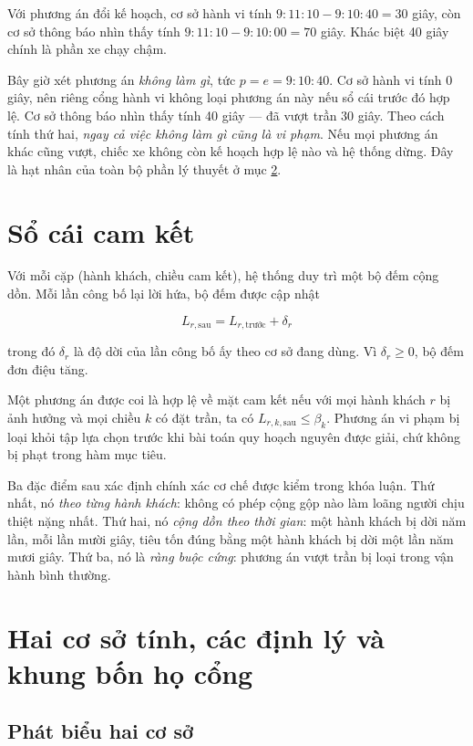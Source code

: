Với phương án đổi kế hoạch, cơ sở hành vi tính $9{:}11{:}10 - 9{:}10{:}40 = 30$ giây, còn cơ sở
thông báo nhìn thấy tính $9{:}11{:}10 - 9{:}10{:}00 = 70$ giây. Khác biệt 40 giây chính là phần xe chạy chậm.

Bây giờ xét phương án \emph{không làm gì}, tức $p = e = 9{:}10{:}40$. Cơ sở hành vi tính 0 giây,
nên riêng cổng hành vi không loại phương án này nếu sổ cái trước đó hợp lệ. Cơ sở thông báo nhìn thấy tính 40 giây --- đã vượt trần 30 giây. Theo cách
tính thứ hai, \emph{ngay cả việc không làm gì cũng là vi phạm}. Nếu mọi phương án khác cũng vượt,
chiếc xe không còn kế hoạch hợp lệ nào và hệ thống dừng. Đây là hạt nhân của toàn bộ phần lý
thuyết ở mục \ref{muc:haicosotinh}.

\section{Sổ cái cam kết}

Với mỗi cặp (hành khách, chiều cam kết), hệ thống duy trì một bộ đếm cộng dồn. Mỗi lần công bố
lại lời hứa, bộ đếm được cập nhật

\begin{equation}
L_{r,\text{sau}} = L_{r,\text{trước}} + \delta_r
\end{equation}

trong đó $\delta_r$ là độ dời của lần công bố ấy theo cơ sở đang dùng. Vì $\delta_r \ge 0$, bộ
đếm đơn điệu tăng.

Một phương án được coi là hợp lệ về mặt cam kết nếu với mọi hành khách $r$ bị ảnh hưởng và mọi
chiều $k$ có đặt trần, ta có $L_{r,k,\text{sau}} \le \beta_k$. Phương án vi phạm bị loại khỏi
tập lựa chọn trước khi bài toán quy hoạch nguyên được giải, chứ không bị phạt trong hàm mục
tiêu.

Ba đặc điểm sau xác định chính xác cơ chế được kiểm trong khóa luận. Thứ
nhất, nó \emph{theo từng hành khách}: không có phép cộng gộp nào làm loãng người chịu thiệt
nặng nhất. Thứ hai, nó \emph{cộng dồn theo thời gian}: một hành khách bị dời năm lần, mỗi lần
mười giây, tiêu tốn đúng bằng một hành khách bị dời một lần năm mươi giây. Thứ ba, nó là
\emph{ràng buộc cứng}: phương án vượt trần bị loại trong vận hành bình thường.

\section{Hai cơ sở tính, các định lý và khung bốn họ cổng}
\label{muc:haicosotinh}

\subsection{Phát biểu hai cơ sở}

